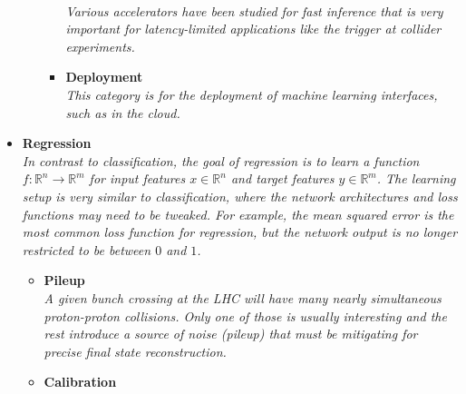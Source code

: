 \documentclass[12pt,letterpaper]{article}
\begin{document}
\begin{itemize}
\begin{itemize}
\begin{itemize}
				\\\textit{Various accelerators have been studied for fast inference that is very important for latency-limited applications like the trigger at collider experiments.}
				\item \textbf{Deployment}~\cite{Li:2024uju,Bieringer:2024pzt,Savard:2023wwi,Holmberg:2023rfr,SunnebornGudnadottir:2021nhk,Kuznetsov:2020mcj}
				\\\textit{This category is for the deployment of machine learning interfaces, such as in the cloud.}
			\end{itemize}
	\end{itemize}
\item \textbf{Regression}
\\\textit{In contrast to classification, the goal of regression is to learn a function $f:\mathbb{R}^n\rightarrow\mathbb{R}^m$ for input features $x\in\mathbb{R}^n$ and target features $y\in\mathbb{R}^m$.  The learning setup is very similar to classification, where the network architectures and loss functions may need to be tweaked.  For example, the mean squared error is the most common loss function for regression, but the network output is no longer restricted to be between $0$ and $1$.}
	\begin{itemize}
		\item \textbf{Pileup}~\cite{Algren:2024bqw,Lieret:2023aqg,Kim:2023koz,CRESST:2022qor,Li:2022omf,Maier:2021ymx,Carrazza:2019efs,Martinez:2018fwc,ATL-PHYS-PUB-2019-028,Komiske:2017ubm}
		\\\textit{A given bunch crossing at the LHC will have many nearly simultaneous proton-proton collisions.  Only one of those is usually interesting and the rest introduce a source of noise (pileup) that must be mitigating for precise final state reconstruction.}
		\item \textbf{Calibration}~\cite{Akchurin:2024ffj,Britton:2024pdy,Hashmani:2024ykk,Zdybal:2024yzu,Kocot:2023izs,Acosta:2023nuw,Bein:2023ylt,Holmberg:2023rfr,Meyer:2023ffd,ALICETPC:2023ojd,ATLAS:2023tyv,Khozani:2023bql,Raine:2023fko,Soleymaninia:2023dds,Grosso:2023ltd,Grosso:2023jxp,Basak:2023wzq,Schwenker:2023bih,Lee:2023jew,Aad:2023ula,Guglielmi:2022ftj,Ge:2022xrv,Darulis:2022brn,Leigh:2022lpn,Valsecchi:2022rla,Gambhir:2022dut,Gambhir:2022gua,Akchurin:2022apq,Qiu:2022xvr,Alves:2022gnw,Dorigo:2022tfi,Chadeeva:2022kay,Pata:2022wam,Renteria-Estrada:2021zrd,Kronheim:2021hdb,Arratia:2021tsq,Micallef:2021src,Polson:2021kvr,Diefenthaler:2021rdj,Akchurin:2021ahx,Kieseler:2020wcq,Akchurin:2021afn,Pollard:2021fqv,Kieseler:2021jxc,Du:2020pmp,Baldi:2020hjm,Sirunyan:2019wwa,Kasieczka:2020vlh,Hooberman:DLPS2017,ATL-PHYS-PUB-2018-013,ATL-PHYS-PUB-2020-001,Cheong:2019upg}

\end{itemize}
\end{itemize}
\end{document}
